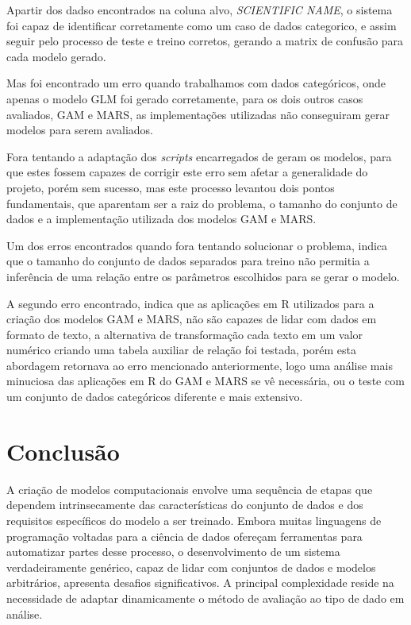 \documentclass[
    12pt,               %
    openright,          %
    oneside,            %
    a4paper,            %
    english,            %
    brazil              %
    ]{abntex2}
\begin{document}
Apartir dos dadso encontrados na coluna alvo, \textit{SCIENTIFIC NAME}, o sistema foi capaz de identificar corretamente
como um caso de dados categorico, e assim seguir pelo processo de teste e treino corretos, gerando a matrix de confusão
para cada modelo gerado.

Mas foi encontrado um erro quando trabalhamos com dados categóricos, onde apenas o modelo GLM foi gerado
corretamente, para os dois outros casos avaliados, GAM e MARS, as implementações utilizadas não conseguiram
gerar modelos para serem avaliados.

Fora tentando a adaptação dos \textit{scripts} encarregados de geram os modelos, para que estes fossem
capazes de corrigir este erro sem afetar a generalidade do projeto, porém sem sucesso, mas este processo
levantou dois pontos fundamentais, que aparentam ser a raiz do problema, o tamanho do conjunto de dados
e a implementação utilizada dos modelos GAM e MARS.

Um dos erros encontrados quando fora tentando solucionar o problema, indica que o tamanho do conjunto
de dados separados para treino não permitia a inferência de uma relação entre os parâmetros escolhidos
para se gerar o modelo.

A segundo erro encontrado, indica que as aplicações em R utilizados para a criação dos modelos GAM e MARS, 
não são capazes de lidar com dados em formato de texto, a alternativa de transformação cada texto em um valor
numérico criando uma tabela auxiliar de relação foi testada, porém esta abordagem retornava ao erro
mencionado anteriormente, logo uma análise mais minuciosa das aplicações em R do GAM e MARS se vê 
necessária, ou o teste com um conjunto de dados categóricos diferente e mais extensivo.

\chapter{Conclusão}

A criação de modelos computacionais envolve uma sequência de etapas que dependem intrinsecamente das características 
do conjunto de dados e dos requisitos específicos do modelo a ser treinado. Embora muitas linguagens de programação 
voltadas para a ciência de dados ofereçam ferramentas para automatizar partes desse processo, o desenvolvimento de um 
sistema verdadeiramente genérico, capaz de lidar com conjuntos de dados e modelos arbitrários, apresenta desafios significativos. 
A principal complexidade reside na necessidade de adaptar dinamicamente o método de avaliação ao tipo de dado em análise.
\end{document}
